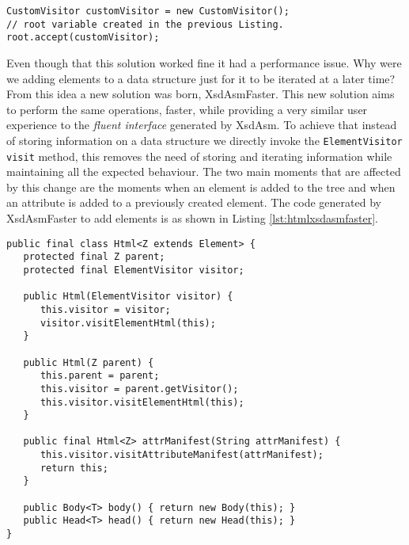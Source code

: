 
\begin{minipage}{\linewidth}
\begin{lstlisting}[caption={HTML5 Tree Visit using XsdAsm},label={lst:treevisit}]
CustomVisitor customVisitor = new CustomVisitor();
// root variable created in the previous Listing.
root.accept(customVisitor);
\end{lstlisting}
\end{minipage}

\noindent
Even though that this solution worked fine it had a performance issue. Why were we adding elements to a data structure just for it to be iterated at a later time? From this idea a new solution was born, XsdAsmFaster. This new solution aims to perform the same operations, faster, while providing a very similar user experience to the \textit{fluent interface} generated by XsdAsm. To achieve that instead of storing information on a data structure we directly invoke the \texttt{ElementVisitor visit} method, this removes the need of storing and iterating information while maintaining all the expected behaviour. The two main moments that are affected by this change are the moments when an element is added to the tree and when an attribute is added to a previously created element. The code generated by XsdAsmFaster to add elements is as shown in Listing \ref{lst:htmlxsdasmfaster}.


\begin{minipage}{\linewidth}
\begin{lstlisting}[caption={Html Class Generated by XsdAsmFaster},label={lst:htmlxsdasmfaster}]
public final class Html<Z extends Element> {
   protected final Z parent;
   protected final ElementVisitor visitor;

   public Html(ElementVisitor visitor) {
      this.visitor = visitor;
      visitor.visitElementHtml(this);
   }

   public Html(Z parent) {
      this.parent = parent;
      this.visitor = parent.getVisitor();
      this.visitor.visitElementHtml(this);
   }
   
   public final Html<Z> attrManifest(String attrManifest) {
      this.visitor.visitAttributeManifest(attrManifest);
      return this;
   }
   
   public Body<T> body() { return new Body(this); }
   public Head<T> head() { return new Head(this); }
}
\end{lstlisting}
\end{minipage}

